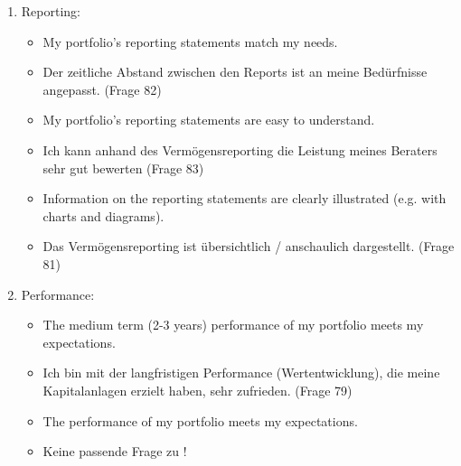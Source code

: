 \documentclass{article}\usepackage[]{graphicx}\usepackage[]{color}
\begin{document}
\begin{enumerate}
    \item Reporting:
    \begin{itemize}
        \item My portfolio’s reporting statements match my needs.
        \item Der zeitliche Abstand zwischen den Reports ist an meine Bedürfnisse angepasst. (Frage 82)
        \item My portfolio’s reporting statements are easy to understand.
        \item Ich kann anhand des Vermögensreporting die Leistung meines Beraters sehr gut bewerten (Frage 83)
        \item Information on the reporting statements are clearly illustrated (e.g. with charts and diagrams).
        \item Das Vermögensreporting ist übersichtlich / anschaulich dargestellt. (Frage 81)
    \end{itemize}
    
    
    
    
    
    \item Performance: 
    \begin{itemize}
        \item The medium term (2-3 years) performance of my portfolio meets my expectations.
        \item Ich bin mit der langfristigen Performance (Wertentwicklung), die meine Kapitalanlagen erzielt haben, sehr zufrieden. (Frage 79)
        \item The performance of my portfolio meets my expectations.
        \item Keine passende Frage zu !
    \end{itemize}


\end{enumerate}
\end{document}
